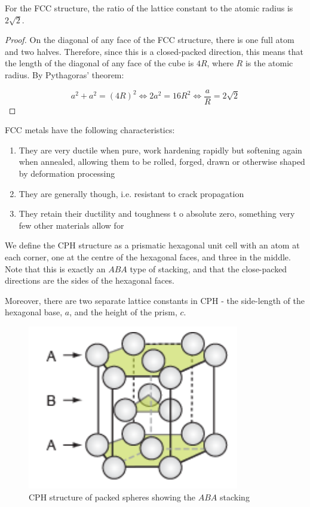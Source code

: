 \documentclass{article}
\begin{document}
\begin{proposition}
    For the FCC structure, the ratio of the lattice constant to the atomic radius is $2\sqrt{2}$.
\end{proposition}

\begin{proof}
    On the diagonal of any face of the FCC structure, there is one full atom and two halves. Therefore, since this is a closed-packed direction, this means that the length of the diagonal of any face of the cube is $4R$, where $R$ is the atomic radius. By Pythagoras' theorem:

    \[ a^2 + a^2 = (4R)^2 \iff 2a^2 = 16R^2 \iff \frac{a}{R} = 2\sqrt{2} \]
\end{proof}

FCC metals have the following characteristics:

\begin{enumerate}
    \item They are very ductile when pure, work hardening rapidly but softening again when annealed, allowing them to be rolled, forged, drawn or otherwise shaped by deformation processing
    \item They are generally though, i.e. resistant to crack propagation
    \item They retain their ductility and toughness t o absolute zero, something very few other materials allow for
\end{enumerate}

\begin{definition}
    We define the CPH structure as a prismatic hexagonal unit cell with an atom at each corner, one at the centre of the hexagonal faces, and three in the middle. Note that this is exactly an $ABA$ type of stacking, and that the close-packed directions are the sides of the hexagonal faces.
\end{definition}

Moreover, there are two separate lattice constants in CPH - the side-length of the hexagonal base, $a$, and the height of the prism, $c$. 

\begin{figure}[h]
    \centering
    \includegraphics{images/mat6.png}
    \caption{CPH structure of packed spheres showing the $ABA$ stacking}
    \label{fig:enter-label}
\end{figure}
\end{document}
